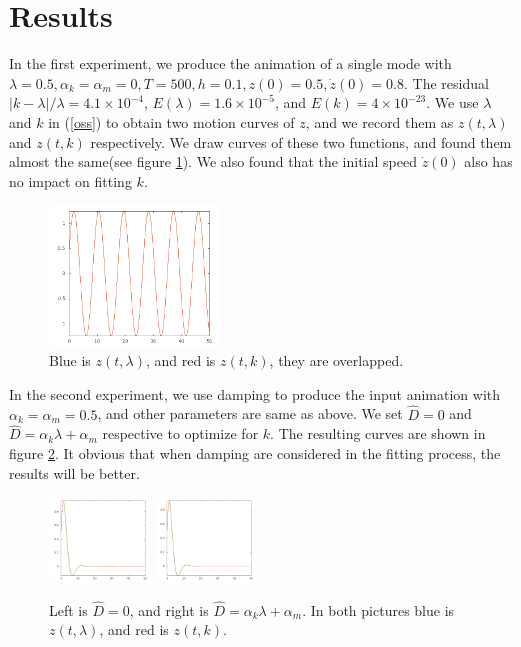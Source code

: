 \documentclass[twocolumn,a4paper]{article}
\begin{document}
\section{Results}
In the first experiment, we produce the animation of a single mode with
$\lambda=0.5,\alpha_k=\alpha_m=0,T=500,h=0.1,z(0)=0.5,\dot{z}(0)=0.8$. The
residual $|k-\lambda|/\lambda=4.1\times 10^{-4}$, $E(\lambda)=1.6\times
10^{-5}$, and $E(k)=4\times 10^{-23}$. We use $\lambda$ and $k$ in (\ref{oss})
to obtain two motion curves of $z$, and we record them as $z(t,\lambda)$ and
$z(t,k)$ respectively. We draw curves of these two functions, and found them
almost the same(see figure \ref{singleModeNoCon}). We also found that the
initial speed $\dot{z}(0)$ also has no impact on fitting $k$.
\begin{figure}
  \centering
  \includegraphics[width=0.4\textwidth]{./figures/singleModeNoDamp.png}
  \caption{Blue is $z(t,\lambda)$, and red is $z(t,k)$, they are overlapped.}
  \label{singleModeNoCon}
\end{figure}

In the second experiment, we use damping to produce the input animation with
$\alpha_k=\alpha_m=0.5$, and other parameters are same as above. We set
$\hat{D}=0$ and $\hat{D} = \alpha_k\lambda+\alpha_m$ respective to optimize for
$k$. The resulting curves are shown in figure \ref{singleModeD}. It obvious that
when damping are considered in the fitting process, the results will be better.
\begin{figure}
  \centering
  \includegraphics[width=0.24\textwidth]{./figures/singleModeD0.png}
  \includegraphics[width=0.24\textwidth]{./figures/singleModeD.png}
  \caption{Left is $\hat{D}=0$, and right is
    $\hat{D}=\alpha_k\lambda+\alpha_m$. In both pictures blue is $z(t,\lambda)$,
    and red is $z(t,k)$.}
  \label{singleModeD}
\end{figure}
\end{document}
